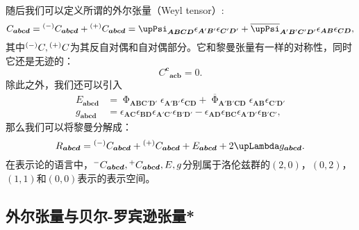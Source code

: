 随后我们可以定义所谓的外尔张量（Weyl tensor）:
\begin{equation}
	C_{\boldsymbol{abcd}} =\prescript{( -)}{}{} C_{\boldsymbol{abcd}} +\prescript{( +)}{}{} C_{\boldsymbol{abcd}} =\upPsi _{\boldsymbol{ABCD}} \epsilon _{\boldsymbol{A} '\boldsymbol{B} '} \epsilon _{\boldsymbol{C} '\boldsymbol{D} '} +\overline{\upPsi }_{\boldsymbol{A} '\boldsymbol{B} '\boldsymbol{C} '\boldsymbol{D} '} \epsilon _{\boldsymbol{AB}} \epsilon _{\boldsymbol{CD}} ,
	\label{eq:5.66}
\end{equation}
其中$\prescript{( -)}{}{} C,\prescript{( +)}{}{} C$为其反自对偶和自对偶部分。它和黎曼张量有一样的对称性，同时它还是无迹的：
\begin{equation}
	C^{\boldsymbol{c}}{}_{\boldsymbol{acb}} =0.
	\label{eq:5.67}
\end{equation}
除此之外，我们还可以引入
\begin{equation*}
	\begin{aligned}
		E_{\boldsymbol{abcd}} & =\upPhi _{\boldsymbol{ABC} '\boldsymbol{D} '} \epsilon _{\boldsymbol{A} '\boldsymbol{B} '} \epsilon _{\boldsymbol{CD}} +\overline{\upPhi }_{\boldsymbol{A} '\boldsymbol{B} '\boldsymbol{CD}} \epsilon _{\boldsymbol{AB}} \epsilon _{\boldsymbol{C} '\boldsymbol{D} '}\\
		g_{\boldsymbol{abcd}} & =\epsilon _{\boldsymbol{AC}} \epsilon _{\boldsymbol{BD}} \epsilon _{\boldsymbol{A} '\boldsymbol{C} '} \epsilon _{\boldsymbol{B} '\boldsymbol{D} '} -\epsilon _{\boldsymbol{AD}} \epsilon _{\boldsymbol{BC}} \epsilon _{\boldsymbol{A} '\boldsymbol{D} '} \epsilon _{\boldsymbol{B} '\boldsymbol{C} '} ,
	\end{aligned}
\end{equation*}
那么我们可以将黎曼分解成：
\begin{equation*}
	R_{\boldsymbol{abcd}} =\prescript{( -)}{}{} C_{\boldsymbol{abcd}} +\prescript{( +)}{}{} C_{\boldsymbol{abcd}} +E_{\boldsymbol{abcd}} +2\upLambda g_{\boldsymbol{abcd}} .
\end{equation*}
在表示论的语言中，$\prescript{-}{}{} C_{\boldsymbol{abcd}} ,\prescript{+}{}{} C_{\boldsymbol{abcd}} ,E,g$分别属于洛伦兹群的$( 2,0)$，$( 0,2)$，$( 1,1)$和$( 0,0)$表示的表示空间。


\subsection{外尔张量与贝尔-罗宾逊张量*}

